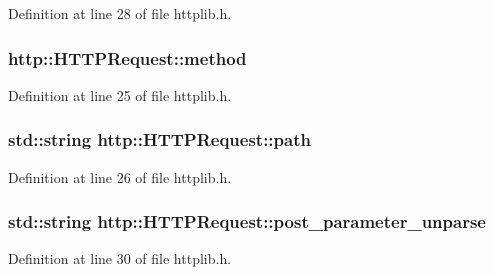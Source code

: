 Definition at line 28 of file httplib.\+h.

\subsubsection[{\texorpdfstring{method}{method}}]{ http\+::\+H\+T\+T\+P\+Request\+::method}\hypertarget{structhttp_1_1HTTPRequest_a61e2631fd10c8a0db0678aa049062d71}{}\label{structhttp_1_1HTTPRequest_a61e2631fd10c8a0db0678aa049062d71}


Definition at line 25 of file httplib.\+h.

\subsubsection[{\texorpdfstring{path}{path}}]{\setlength{\rightskip}{0pt plus 5cm}std\+::string http\+::\+H\+T\+T\+P\+Request\+::path}\hypertarget{structhttp_1_1HTTPRequest_ae9c9b5015784f17eb8a61c3ed93a633c}{}\label{structhttp_1_1HTTPRequest_ae9c9b5015784f17eb8a61c3ed93a633c}


Definition at line 26 of file httplib.\+h.

\subsubsection[{\texorpdfstring{post\+\_\+parameter\+\_\+unparse}{post_parameter_unparse}}]{\setlength{\rightskip}{0pt plus 5cm}std\+::string http\+::\+H\+T\+T\+P\+Request\+::post\+\_\+parameter\+\_\+unparse}\hypertarget{structhttp_1_1HTTPRequest_a2d21fcb7a6169dc3bd8fd2f49a087f79}{}\label{structhttp_1_1HTTPRequest_a2d21fcb7a6169dc3bd8fd2f49a087f79}


Definition at line 30 of file httplib.\+h.

